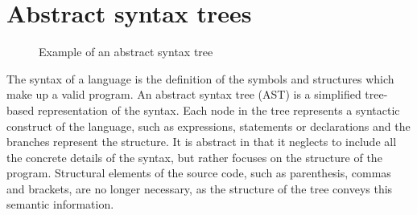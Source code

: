 \documentclass[nofilelist]{cslthse-msc}
\newcommand{\CR}[1]{\textcolor{green!60!black}{[\textbf{CR}:#1]}}
\begin{document}
\section{Abstract syntax trees}\label{abstractsyntaxtrees}
\begin{figure}[]
  \centering
  \caption{Example of an abstract syntax tree}
  \label{astexample}
\end{figure}
The syntax of a language is the definition of the symbols and structures which make up a valid program.
An abstract syntax tree (AST) is a simplified tree-based representation of the syntax.
Each node in the tree represents a syntactic construct of the language, such as expressions, statements or declarations and the branches represent the structure.
It is abstract in that it neglects to include all the concrete details of the syntax, but rather focuses on the structure of the program.
Structural elements of the source code, such as parenthesis, commas and brackets, are no longer necessary, as the structure of the tree conveys this semantic information.
\end{document}
